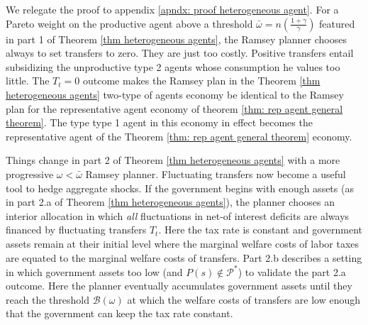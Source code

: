 \documentclass[thmsb,11pt]{article}
\begin{document}
We relegate the proof to appendix \ref{apndx: proof heterogeneous agent}. For a Pareto weight on the productive agent above a
threshold $\bar{\omega}=n\left(\frac{1+\gamma}{\gamma}\right)$  featured in part 1 of Theorem \ref{thm heterogeneous agents}, the Ramsey  planner chooses always to set transfers to zero.
They are just too costly.      Positive  transfers  entail subsidizing the unproductive type 2 agents
whose consumption he values too little.
The $T_t = 0$ outcome  makes  the Ramsey  plan
in the Theorem \ref{thm heterogeneous agents} two-type of agents economy be  identical to the Ramsey plan for the representative agent economy
of theorem \ref{thm: rep agent general theorem}. %
The type type 1 agent in this economy
in effect becomes the representative agent of the Theorem \ref{thm: rep agent general theorem} economy.

\color{black}
 Things change in part 2  of Theorem \ref{thm heterogeneous agents} with a more progressive  $\omega<\bar{\omega}$ Ramsey planner.
Fluctuating transfers  now become a useful  tool to  hedge aggregate shocks.
  If the government begins with enough assets (as in part 2.a of  Theorem \ref{thm heterogeneous agents}),
   the planner
  chooses an interior allocation in which {\em all} fluctuations in net-of interest deficits are always financed by fluctuating transfers $T_t$.
   Here  the tax rate is  constant and government assets remain at their initial level where %
    the marginal welfare costs of labor taxes are equated
 to the marginal welfare costs of transfers. Part 2.b describes a setting in which  government assets too low (and $P(s)\not \in \mathcal{P}^*$) to validate the part 2.a outcome.  Here the planner eventually accumulates government  assets until they reach the threshold $\mathcal{B}(\omega)$
at which the welfare  costs of transfers are  low enough that the government  can  keep the tax rate constant.
\end{document}

